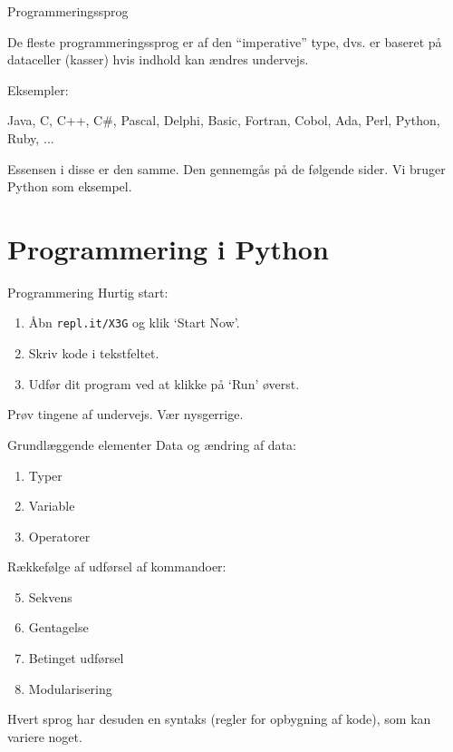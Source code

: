 \documentclass[10pt]{beamer}
\begin{document}
\begin{frame}{Programmeringssprog}

De fleste programmeringssprog er af den ``imperative'' type, dvs. er baseret på dataceller (kasser) hvis indhold kan ændres undervejs.

\medskip
Eksempler:

\alert{Java, C, C++, C\#, Pascal, Delphi, Basic, Fortran, Cobol, Ada, Perl,
Python, Ruby, $\dots$
}

Essensen i disse er den samme. Den gennemgås på de følgende sider. Vi
bruger Python som eksempel.

\end{frame}


\section{Programmering i Python}


\begin{frame}{Programmering}
	Hurtig start:
	
	\begin{enumerate}
		\item \alert{Åbn} \texttt{repl.it/X3G} og klik `Start Now'.
		\item \alert{Skriv} kode i tekstfeltet.
		\item \alert{Udfør} dit program ved at klikke på `Run' øverst.
	\end{enumerate}

	Prøv tingene af undervejs. Vær nysgerrige.
\end{frame}

\begin{frame}{Grundlæggende elementer}
Data og ændring af data:
\begin{enumerate}
	\item Typer
	\item Variable
	\item Operatorer
\end{enumerate}
Rækkefølge af udførsel af kommandoer:
\begin{enumerate}
	\setcounter{enumi}{4}
	\item Sekvens
	\item Gentagelse
	\item Betinget udførsel
	\item Modularisering
\end{enumerate}

Hvert sprog har desuden en \alert{syntaks} (regler for opbygning af kode),
som kan variere noget.
\end{frame}
\end{document}
